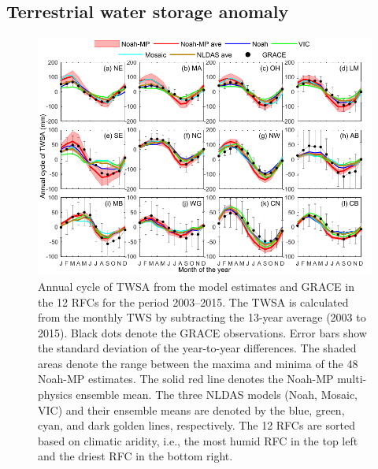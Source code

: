 \documentclass[essd, manuscript]{copernicus}
\begin{document}
\subsection{Terrestrial water storage anomaly}\label{sec:results:twsa}

\begin{figure}[t]
  \includegraphics[width=14cm]{fig/fig01.pdf}
  \caption{Annual cycle of TWSA from the model estimates and GRACE in the 12 RFCs for the period 2003--2015. The TWSA is calculated from the monthly TWS by subtracting the 13-year average (2003 to 2015). Black dots denote the GRACE observations. Error bars show the standard deviation of the year-to-year differences. The shaded areas denote the range between the maxima and minima of the 48 Noah-MP estimates. The solid red line denotes the Noah-MP multi-physics ensemble mean. The three NLDAS models (Noah, Mosaic, VIC) and their ensemble means are denoted by the blue, green, cyan, and dark golden lines, respectively. The 12 RFCs are sorted based on climatic aridity, i.e., the most humid RFC in the top left and the driest RFC in the bottom right.}
  \label{fig:twsa:ancy}
\end{figure}
\end{document}
